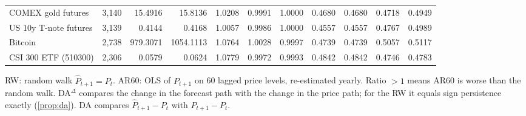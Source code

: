 \begin{table}[!htbp]
\begin{adjustbox}{max width=\textwidth}
\begin{tabular}{lrrrrrrrrrr}
COMEX gold futures & 3,140 & 15.4916 & 15.8136 & 1.0208 & 0.9991 & 1.0000 & 0.4680 & 0.4680 & 0.4718 & 0.4949\\
US 10y T-note futures & 3,139 & 0.4144 & 0.4168 & 1.0057 & 0.9986 & 1.0000 & 0.4557 & 0.4557 & 0.4767 & 0.4989\\
Bitcoin & 2,738 & 979.3071 & 1054.1113 & 1.0764 & 1.0028 & 0.9997 & 0.4739 & 0.4739 & 0.5057 & 0.5117\\
CSI 300 ETF (510300) & 2,306 & 0.0579 & 0.0624 & 1.0779 & 0.9972 & 0.9993 & 0.4842 & 0.4842 & 0.4746 & 0.4783\\
\bottomrule
\end{tabular}
\end{adjustbox}
\par\smallskip\begin{minipage}{\textwidth}\footnotesize
RW: random walk $\hat P_{t+1}=P_t$. AR60: OLS of $P_{t+1}$ on 60 lagged price levels, re-estimated yearly. Ratio $>1$ means AR60 is worse than the random walk. DA$^{\Delta}$ compares the change in the forecast path with the change in the price path; for the RW it equals sign persistence exactly (\cref{prop:da}). DA compares $\hat P_{t+1}-P_t$ with $P_{t+1}-P_t$.
\end{minipage}
\end{table}